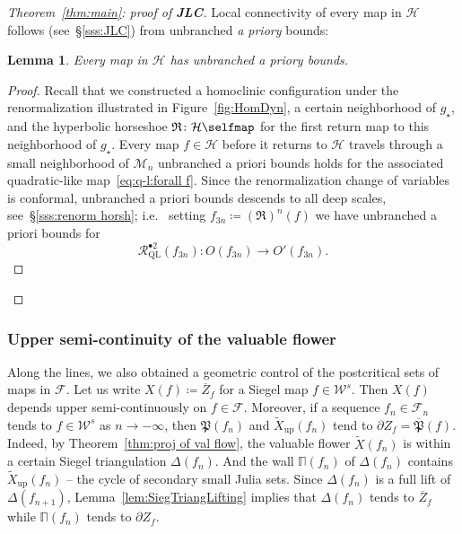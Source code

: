 \documentclass{amsart}
\newcommand{\1}{{\mathbb 1 }}
\newcommand\MM{\mathscr{M}}
\newcommand\Hors{{\mathcal H}}
\newcommand{\bDelta}{{\mathbb{\Delta}}}
\newcommand{\bPi}{{\mathbb{\Pi}}}
\newcommand\RRR{{\mathfrak R}}
\newcommand\RR{\mathcal{R}}
\newcommand\Post{{\mathfrak P}}
\newcommand{\str}{{\star}}
\newcommand\WW{\mathcal{W}}
\newcommand\up{{\operatorname{up}}}
\newcommand{\bFol}{{\boldsymbol{ \mathcal F}}}
\newtheorem{lem}[thm]{Lemma}
\theoremstyle{remark}
\numberwithin{equation}{section}
\theoremstyle{definition}
\def\QL{{\text{QL}}}
\theoremstyle{nonumberbreak}
\begin{document}
\begin{proof}[Theorem~\ref{thm:main}: proof of {\bf JLC}] Local connectivity of every map in $\Hors$ follows (see~\S\ref{sss:JLC}) from unbranched \emph{a priory} bounds:  
\begin{lem}
Every map in $\Hors$ has unbranched a priory bounds.  
\end{lem}
\begin{proof}
Recall that we constructed a homoclinic configuration under the renormalization illustrated in Figure~\ref{fig:HomDyn}, a certain neighborhood of $g_\str$, and the hyperbolic horseshoe $ \RRR\colon \Hors \selfmap$ for the first return map to this neighborhood of $g_\str$. Every map $f\in \Hors$ before it returns to $\Hors$ travels through a small neighborhood of $\MM_n$ unbranched a priori bounds holds for the associated quadratic-like map~\eqref{eq:q-l:forall f}. Since the renormalization change of variables is conformal, unbranched a priori bounds descends to all deep scales, see~\S\ref{sss:renorm horsh}; i.e.~ setting $f_{3n}\coloneqq \left(\RRR\right)^n(f)$ we have unbranched a priori bounds for 
\begin{equation}
\label{eq:ql:f_3n+2}
 \RR_\QL^{\bullet 2} (f_{3n})\colon O(f_{3n})\to O'(f_{3n}).
\end{equation} 
\end{proof}
\end{proof}



\subsubsection{Upper semi-continuity of the valuable flower}
\label{sss:contr post set} Along the lines, we also obtained a geometric control of the postcritical sets of maps in $\bFol$. Let us write $ X(f)\coloneqq \overline Z_f$ for a Siegel map $f\in \WW^s$. Then $X(f)$ depends upper semi-continuously on $f\in \bFol$. Moreover, if a sequence $f_n\in \bFol_{n}$ tends to $f\in \WW^s$ as $n\to -\infty$, then $\Post(f_n)$ and $\widetilde X_\up (f_n)$ tend to $\partial  Z_f= \overline \Post(f)$.  Indeed, by Theorem~\ref{thm:proj of val flow}, the valuable flower $\widetilde X(f_n)$ is within a certain Siegel triangulation $\bDelta(f_n)$. And the wall $\bPi(f_n)$ of $\bDelta(f_n)$ contains $ \widetilde X_\up(f_n)$ -- the cycle of secondary small Julia sets. Since  $\bDelta(f_n)$ is a full lift of  $\bDelta(f_{n+1})$, Lemma~\ref{lem:SiegTriangLifting} implies that $\bDelta(f_n)$ tends to $\overline Z_f$ while $\bPi(f_n)$ tends to $\partial Z_f$.
\end{document}
